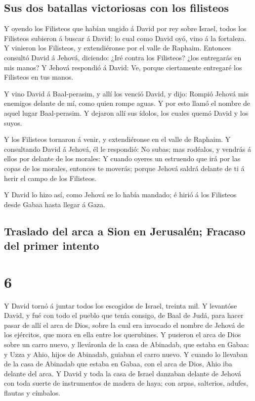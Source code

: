 \hypertarget{sus-dos-batallas-victoriosas-con-los-filisteos}{%
\subsection{Sus dos batallas victoriosas con los
filisteos}\label{sus-dos-batallas-victoriosas-con-los-filisteos}}

 Y oyendo los Filisteos que habían ungido á David por rey
sobre Israel, todos los Filisteos subieron á buscar á David: lo cual
como David oyó, vino á la fortaleza.  Y vinieron los
Filisteos, y extendiéronse por el valle de Raphaim. 
Entonces consultó David á Jehová, diciendo: ¿Iré contra los Filisteos?
¿los entregarás en mis manos? Y Jehová respondió á David: Ve, porque
ciertamente entregaré los Filisteos en tus manos.

 Y vino David á Baal-perasim, y allí los venció David, y
dijo: Rompió Jehová mis enemigos delante de mí, como quien rompe aguas.
Y por esto llamó el nombre de aquel lugar Baal-perasim. 
Y dejaron allí sus ídolos, los cuales quemó David y los suyos.

 Y los Filisteos tornaron á venir, y extendiéronse en el
valle de Raphaim.  Y consultando David á Jehová, él le
respondió: No subas; mas rodéalos, y vendrás á ellos por delante de los
morales:  Y cuando oyeres un estruendo que irá por las
copas de los morales, entonces te moverás; porque Jehová saldrá delante
de ti á herir el campo de los Filisteos.

 Y David lo hizo así, como Jehová se lo había mandado; é
hirió á los Filisteos desde Gabaa hasta llegar á Gaza.

\hypertarget{traslado-del-arca-a-sion-en-jerusaluxe9n-fracaso-del-primer-intento}{%
\subsection{Traslado del arca a Sion en Jerusalén; Fracaso del primer
intento}\label{traslado-del-arca-a-sion-en-jerusaluxe9n-fracaso-del-primer-intento}}

\hypertarget{section-10-6}{%
\section{6}\label{section-10-6}}

 Y David tornó á juntar todos los escogidos de Israel,
treinta mil.  Y levantóse David, y fué con todo el pueblo
que tenía consigo, de Baal de Judá, para hacer pasar de allí el arca de
Dios, sobre la cual era invocado el nombre de Jehová de los ejércitos,
que mora en ella entre los querubines.  Y pusieron el arca
de Dios sobre un carro nuevo, y lleváronla de la casa de Abinadab, que
estaba en Gabaa: y Uzza y Ahio, hijos de Abinadab, guiaban el carro
nuevo.  Y cuando lo llevaban de la casa de Abinadab que
estaba en Gabaa, con el arca de Dios, Ahio iba delante del arca.
 Y David y toda la casa de Israel danzaban delante de
Jehová con toda suerte de instrumentos de madera de haya; con arpas,
salterios, adufes, flautas y címbalos.

